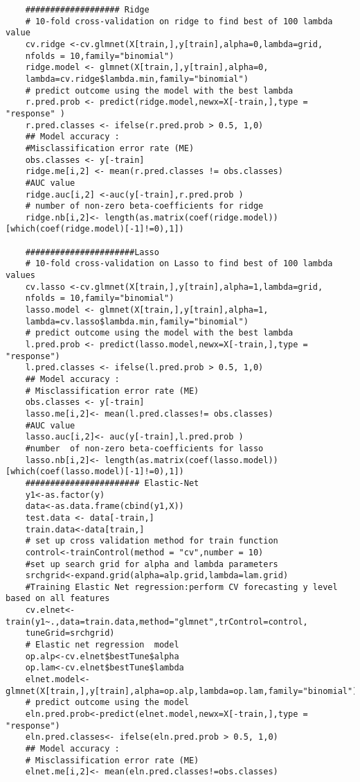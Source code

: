 \documentclass[12pt]{report}
\begin{document}
\begin{lstlisting}
	################### Ridge
	# 10-fold cross-validation on ridge to find best of 100 lambda value
	cv.ridge <-cv.glmnet(X[train,],y[train],alpha=0,lambda=grid,
	nfolds = 10,family="binomial")
	ridge.model <- glmnet(X[train,],y[train],alpha=0,
	lambda=cv.ridge$lambda.min,family="binomial")
	# predict outcome using the model with the best lambda
	r.pred.prob <- predict(ridge.model,newx=X[-train,],type = "response" )
	r.pred.classes <- ifelse(r.pred.prob > 0.5, 1,0)
	## Model accuracy :
	#Misclassification error rate (ME)
	obs.classes <- y[-train]
	ridge.me[i,2] <- mean(r.pred.classes != obs.classes)
	#AUC value
	ridge.auc[i,2] <-auc(y[-train],r.pred.prob )
	# number of non-zero beta-coefficients for ridge
	ridge.nb[i,2]<- length(as.matrix(coef(ridge.model))[which(coef(ridge.model)[-1]!=0),1])
	
	######################Lasso
	# 10-fold cross-validation on Lasso to find best of 100 lambda values
	cv.lasso <-cv.glmnet(X[train,],y[train],alpha=1,lambda=grid,
	nfolds = 10,family="binomial")
	lasso.model <- glmnet(X[train,],y[train],alpha=1,
	lambda=cv.lasso$lambda.min,family="binomial")
	# predict outcome using the model with the best lambda
	l.pred.prob <- predict(lasso.model,newx=X[-train,],type = "response")
	l.pred.classes <- ifelse(l.pred.prob > 0.5, 1,0)
	## Model accuracy :
	# Misclassification error rate (ME)
	obs.classes <- y[-train]
	lasso.me[i,2]<- mean(l.pred.classes!= obs.classes)
	#AUC value
	lasso.auc[i,2]<- auc(y[-train],l.pred.prob )
	#number  of non-zero beta-coefficients for lasso
	lasso.nb[i,2]<- length(as.matrix(coef(lasso.model))[which(coef(lasso.model)[-1]!=0),1])
	####################### Elastic-Net
	y1<-as.factor(y)
	data<-as.data.frame(cbind(y1,X))
	test.data <- data[-train,]
	train.data<-data[train,]
	# set up cross validation method for train function
	control<-trainControl(method = "cv",number = 10)
	#set up search grid for alpha and lambda parameters
	srchgrid<-expand.grid(alpha=alp.grid,lambda=lam.grid)
	#Training Elastic Net regression:perform CV forecasting y level based on all features
	cv.elnet<-train(y1~.,data=train.data,method="glmnet",trControl=control,
	tuneGrid=srchgrid)
	# Elastic net regression  model 
	op.alp<-cv.elnet$bestTune$alpha
	op.lam<-cv.elnet$bestTune$lambda
	elnet.model<-glmnet(X[train,],y[train],alpha=op.alp,lambda=op.lam,family="binomial")
	# predict outcome using the model
	eln.pred.prob<-predict(elnet.model,newx=X[-train,],type = "response")
	eln.pred.classes<- ifelse(eln.pred.prob > 0.5, 1,0)
	## Model accuracy :
	# Misclassification error rate (ME)
	elnet.me[i,2]<- mean(eln.pred.classes!=obs.classes)

\end{lstlisting}
\end{document}
